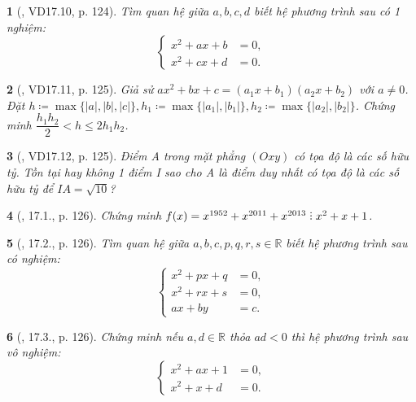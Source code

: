 \documentclass{article}
\newtheorem{baitoan}{}
\DeclareRobustCommand{\divby}{%
	\mathrel{\vbox{\baselineskip.65ex\lineskiplimit0pt\hbox{.}\hbox{.}\hbox{.}}}%
}
\begin{document}
\begin{baitoan}[\cite{TLCT_THCS_Toan_9_dai_so}, VD17.10, p. 124]
	Tìm quan hệ giữa $a,b,c,d$ biết hệ phương trình sau có 1 nghiệm:
	\begin{equation*}
		\left\{\begin{split}
			x^2 + ax + b &= 0,\\
			x^2 + cx + d &= 0.
		\end{split}\right.
	\end{equation*}
\end{baitoan}

\begin{baitoan}[\cite{TLCT_THCS_Toan_9_dai_so}, VD17.11, p. 125]
	Giả sử $ax^2 + bx + c = (a_1x + b_1)(a_2x + b_2)$ với $a\ne0$. Đặt $h\coloneqq\max\{|a|,|b|,|c|\},h_1\coloneqq\max\{|a_1|,|b_1|\},h_2\coloneqq\max\{|a_2|,|b_2|\}$. Chứng minh $\dfrac{h_1h_2}{2} < h\le2h_1h_2$.
\end{baitoan}

\begin{baitoan}[\cite{TLCT_THCS_Toan_9_dai_so}, VD17.12, p. 125]
	Điểm A trong mặt phẳng $(Oxy)$ có tọa độ là các số hữu tỷ. Tồn tại hay không 1 điểm I sao cho A là điểm duy nhất có tọa độ là các số hữu tỷ để $IA = \sqrt{10}$?
\end{baitoan}

\begin{baitoan}[\cite{TLCT_THCS_Toan_9_dai_so}, 17.1., p. 126]
	Chứng minh $f(x) = x^{1952} + x^{2011} + x^{2013}\divby x^2 + x + 1$.
\end{baitoan}

\begin{baitoan}[\cite{TLCT_THCS_Toan_9_dai_so}, 17.2., p. 126]
	Tìm quan hệ giữa $a,b,c,p,q,r,s\in\mathbb{R}$ biết hệ phương trình sau có nghiệm:
	\begin{equation*}
		\left\{\begin{split}
			x^2 + px + q &= 0,\\
			x^2 + rx + s &= 0,\\
			ax + by &= c.
		\end{split}\right.
	\end{equation*}
\end{baitoan}

\begin{baitoan}[\cite{TLCT_THCS_Toan_9_dai_so}, 17.3., p. 126]
	Chứng minh nếu $a,d\in\mathbb{R}$ thỏa $ad < 0$ thì hệ phương trình sau vô nghiệm:
	\begin{equation*}
		\left\{\begin{split}
			x^2 + ax + 1 &= 0,\\
			x^2 + x + d &= 0.
		\end{split}\right.
	\end{equation*}
\end{baitoan}
\end{document}
